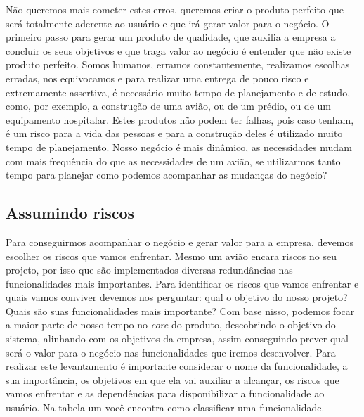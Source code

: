     Não queremos mais cometer estes erros, queremos criar o produto perfeito que
    será totalmente aderente ao usuário e que irá gerar valor para o negócio. O
    primeiro passo para gerar um produto de qualidade, que auxilia a empresa a
    concluir os seus objetivos e que traga valor ao negócio é entender que não
    existe produto perfeito. Somos humanos, erramos constantemente, realizamos
    escolhas erradas, nos equivocamos e para realizar uma entrega de pouco risco
    e extremamente assertiva, é necessário muito tempo de planejamento e de estudo,
    como, por exemplo, a construção de uma avião, ou de um prédio, ou de um equipamento
    hospitalar. Estes produtos não podem ter falhas, pois caso tenham, é um risco
    para a vida das pessoas e para a construção deles é utilizado muito tempo de
    planejamento. Nosso negócio é mais dinâmico, as necessidades mudam com
    mais frequência do que as necessidades de um avião, se utilizarmos tanto tempo
    para planejar como podemos acompanhar as mudanças do negócio?

    \subsection{Assumindo riscos}
      Para conseguirmos acompanhar o negócio e gerar valor para a empresa, devemos
      escolher os riscos que vamos enfrentar. Mesmo um avião encara riscos no seu
      projeto, por isso que são implementados diversas redundâncias nas funcionalidades
      mais importantes. Para identificar os riscos que vamos enfrentar e quais vamos
      conviver devemos nos perguntar: qual o objetivo do nosso projeto? Quais são
      suas funcionalidades mais importante? \newline
      Com base nisso, podemos focar a maior parte de nosso tempo no \textit{core}
      do produto, descobrindo o objetivo do sistema, alinhando com os objetivos
      da empresa, assim conseguindo prever qual será o valor para o negócio nas
      funcionalidades que iremos desenvolver. Para realizar este levantamento é
      importante considerar o nome da funcionalidade, a sua importância, os objetivos
      em que ela vai auxiliar a alcançar, os riscos que vamos enfrentar e as dependências
      para disponibilizar a funcionalidade ao usuário. Na tabela um você encontra
      como classificar uma funcionalidade. \newline

